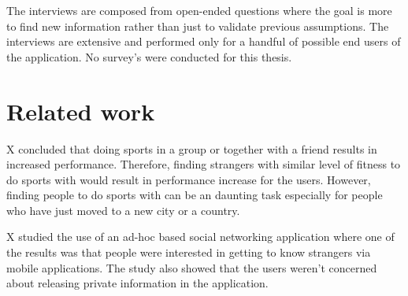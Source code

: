 The interviews are composed from open-ended questions where the goal is more to find new information rather than just to validate previous assumptions. The interviews are extensive and performed only for a handful of possible end users of the application. No survey's were conducted for this thesis.

\section{Related work}

X concluded that doing sports in a group or together with a friend results in increased performance. Therefore, finding strangers with similar level of fitness to do sports with would result in performance increase for the users. However, finding people to do sports with can be an daunting task especially for people who have just moved to a new city or a country.

X studied the use of an  ad-hoc based social networking application where one of the results was that people were interested in getting to know strangers via mobile applications. The study also showed that the users weren't concerned about releasing private information in the application.

